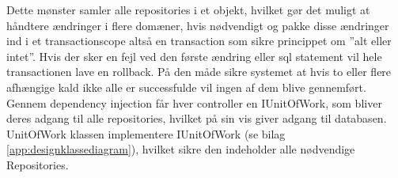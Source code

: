 Dette mønster samler alle repositories i et objekt, hvilket gør det muligt at håndtere ændringer i flere domæner, 
hvis nødvendigt og pakke disse ændringer ind i et transactionscope altså en transaction som sikre princippet om ”alt eller intet”. 
Hvis der sker en fejl ved den første ændring eller sql statement vil hele transactionen lave en rollback. På den måde sikre systemet 
at hvis to eller flere afhængige kald ikke alle er successfulde vil ingen af dem blive gennemført. \\

Gennem dependency injection får hver controller en IUnitOfWork, 
som bliver deres adgang til alle repositories, hvilket på sin vis giver adgang til databasen.\\

UnitOfWork klassen implementere IUnitOfWork (se bilag \ref{app:designklassediagram}), 
hvilket sikre den indeholder alle nødvendige Repositories.